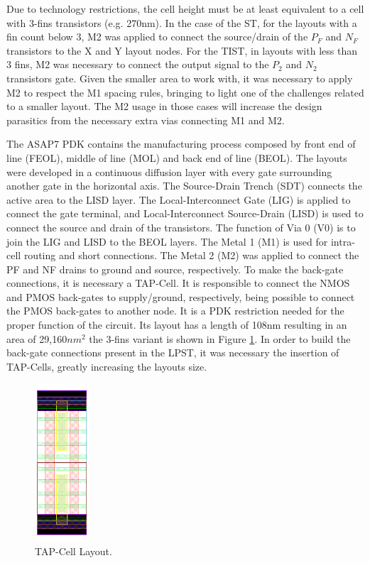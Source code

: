 \documentclass[diss,pgmicro,english]{iiufrgs}
\begin{document}


Due to technology restrictions, the cell height must be at least equivalent to a cell with 3-fins transistors (e.g. 270nm). In the case of the ST, for the layouts with a fin count below 3, M2 was applied to connect the source/drain of the ${P_F}$ and ${N_F}$ transistors to the X and Y layout nodes. For the TIST, in layouts with less than 3 fins, M2 was necessary to connect the output signal to the $P_2$ and $N_2$ transistors gate. Given the smaller area to work with, it was necessary to apply M2 to respect the M1 spacing rules, bringing to light one of the challenges related to a smaller layout. The M2 usage in those cases will increase the design parasitics from the necessary extra vias connecting M1 and M2.


The ASAP7 PDK contains the manufacturing process composed by front end of line (FEOL), middle of line (MOL) and back end of line (BEOL). The layouts were developed in a continuous diffusion layer with every gate surrounding another gate in the horizontal axis. The Source-Drain Trench (SDT) connects the active area to the LISD layer. The Local-Interconnect Gate (LIG) is applied to connect the gate terminal, and Local-Interconnect Source-Drain (LISD) is used to connect the source and drain of the transistors. The function of Via 0 (V0) is to join the LIG and LISD to the BEOL layers. The Metal 1 (M1) is used for intra-cell routing and short connections. The Metal 2 (M2) was applied to connect the PF and NF drains to ground and source, respectively. To make the back-gate connections, it is necessary a TAP-Cell. It is responsible to connect the NMOS and PMOS back-gates to supply/ground, respectively, being possible to connect the PMOS back-gates to another node. It is a PDK restriction needed for the proper function of the circuit. Its layout has a length of 108nm resulting in an area of 29,160$nm^{2}$ the 3-fins variant is shown in Figure \ref{tap}. In order to build the back-gate connections present in the LPST, it was necessary the insertion of TAP-Cells, greatly increasing the layouts size.

\begin{figure}[t]
\centering
\includegraphics[width=0.18\textwidth]{TAP.png}
\caption{TAP-Cell Layout.}
\label{tap}
\end{figure}
\end{document}
